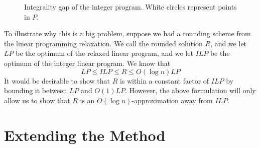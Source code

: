 \documentclass[11pt]{article}
\begin{document}
\begin{figure}
\centering
{}
\caption{Integrality gap of the integer program. White circles represent points in $P$.}
\label{fig:integralitygap}
\end{figure}

To illustrate why this is a big problem, suppose we had a rounding scheme from the linear programming relaxation. We call the rounded solution $R$, and we let $LP$ be the optimum of the relaxed linear program, and we let $ILP$ be the optimum of the integer linear program. We know that
\[ LP \leq ILP \leq R \leq O(\log n)LP \]
It would be desirable to show that $R$ is within a constant factor of $ILP$ by bounding it between $LP$ and $O(1)LP$. However, the above formulation will only allow us to show that $R$ is an $O(\log n)$-approximation away from $ILP$.

\section{Extending the Method}
\end{document}
